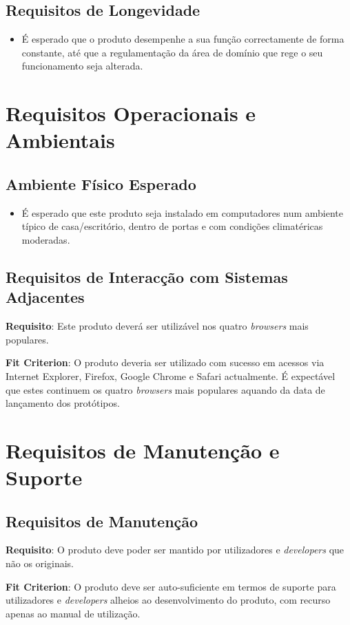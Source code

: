 \subsection{Requisitos de Longevidade}
\begin{itemize}
\item É esperado que o produto desempenhe a sua função correctamente de forma constante, até que a regulamentação da área de domínio que rege o seu funcionamento seja alterada.
\end{itemize}


\section{Requisitos Operacionais e Ambientais}
\subsection{Ambiente Físico Esperado}
\begin{itemize}
\item É esperado que este produto seja instalado em computadores num ambiente típico de casa/escritório, dentro de portas e com condições climatéricas moderadas.
\end{itemize}


\subsection{Requisitos de Interacção com Sistemas Adjacentes}
\begin{description}
\item \textbf{Requisito}: Este produto deverá ser utilizável nos quatro \emph{browsers} mais populares.\\

\item \textbf{Fit Criterion}: O produto deveria ser utilizado com sucesso em acessos via Internet Explorer, Firefox, Google Chrome e Safari actualmente. É expectável que estes continuem os quatro \emph{browsers} mais populares aquando da data de lançamento dos protótipos.
\end{description} 

\section{Requisitos de Manutenção e Suporte}
\subsection{Requisitos de Manutenção}
\begin{description}
\item \textbf{Requisito}: O produto deve poder ser mantido por utilizadores e \emph{developers} que não os originais.\\

\item \textbf{Fit Criterion}: O produto deve ser auto-suficiente em termos de suporte para utilizadores e \emph{developers} alheios ao desenvolvimento do produto, com recurso apenas ao manual de utilização.
\end{description}

